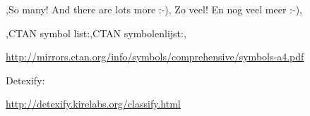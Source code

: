 \begin{frame}
	\begin{center}
		\lang,So many! And there are lots more :-), Zo veel! En nog veel meer :-),
	\end{center}

	\begin{center}
		\lang,CTAN symbol list:,CTAN symbolenlijst:,\par
		\url{http://mirrors.ctan.org/info/symbols/comprehensive/symbols-a4.pdf}
	\end{center}
	
	\begin{center}
		Detexify:\par
		\url{http://detexify.kirelabs.org/classify.html}
	\end{center}
\end{frame}
